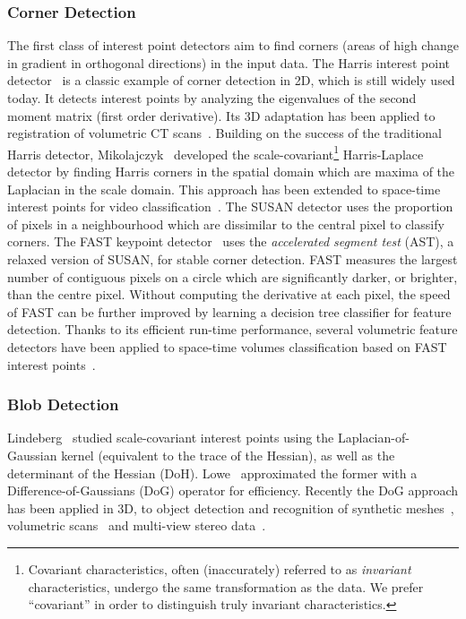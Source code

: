 \subsubsection{Corner Detection}
The first class of interest point detectors aim to find corners (\ie areas of high change in gradient in orthogonal directions) in the input data. 
The Harris interest point detector~\cite{Harris1988} is a classic example of corner detection in 2D, which is still widely used today. It detects interest points by analyzing the eigenvalues of the second moment matrix (first order derivative). Its 3D adaptation has been applied to registration of volumetric CT scans~\cite{Ruiz-Alzola2001,dalvi2010}.  
Building on the success of the traditional Harris detector, Mikolajczyk~\cite{Mikolajczyk2004} developed the scale-covariant\footnote{Covariant characteristics, often (inaccurately) referred to as \emph{invariant} characteristics, undergo the same transformation as the data. We prefer ``covariant'' in order to distinguish truly invariant characteristics.} Harris-Laplace detector by finding Harris corners in the spatial domain which are maxima of the Laplacian in the scale domain. This approach has been extended to space-time interest points for video classification~\cite{Laptev2005}. The SUSAN detector \cite{Smith1997} uses the proportion of pixels in a neighbourhood which are dissimilar to the central pixel to classify corners. The FAST keypoint detector~\cite{Rosten2010} uses the \emph{accelerated segment test} (AST), a relaxed version of SUSAN, for stable corner detection. FAST measures the largest number of contiguous pixels on a circle which are significantly darker, or brighter, than the centre pixel. Without computing the derivative at each pixel, the speed of FAST can be further improved by learning a decision tree classifier for feature detection. Thanks to its efficient run-time performance, several volumetric feature detectors have been applied to space-time volumes classification based on FAST interest points~\cite{Koelstra2009,Yu2010}. 

\subsubsection{Blob Detection}

Lindeberg~\cite{Lindeberg1998} studied scale-covariant interest points using the Laplacian-of-Gaussian kernel (equivalent to the trace of the Hessian), as well as the determinant of the Hessian (DoH).
Lowe~\cite{Lowe2004} approximated the former with a Difference-of-Gaussians (DoG) operator for efficiency. Recently the DoG approach has been applied in 3D, to object detection and recognition of synthetic meshes~\cite{Wessel2006}, volumetric scans~\cite{Flitton2010} and multi-view stereo data~\cite{Pham2011}.

